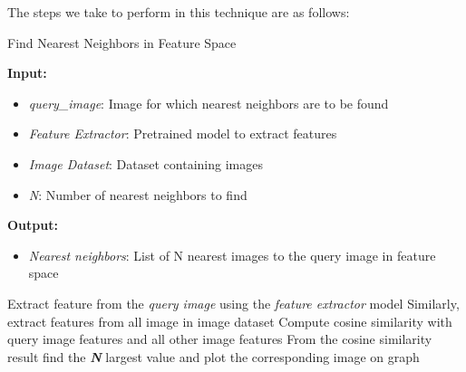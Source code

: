 The steps we take to perform in this technique are as follows:\par\vspace{1em}
\begin{algorithm}
\caption{Find Nearest Neighbors in Feature Space}
\label{alg:nearest_neighbors}

\textbf{Input:}
\begin{itemize}
    \item \textit{query\_image}: Image for which nearest neighbors are to be found
    \item \textit{Feature Extractor}: Pretrained model to extract features
    \item \textit{Image Dataset}: Dataset containing images
    \item \textit{N}: Number of nearest neighbors to find
\end{itemize}

\textbf{Output:}
\begin{itemize}
    \item \textit{Nearest neighbors}: List of N nearest images to the query image in feature space
\end{itemize}

\begin{algorithmic}[1]
    \State Extract feature from the \textit{query image} using the \textit{feature extractor} model
    \State Similarly, extract features from all image in image dataset
    \State Compute cosine similarity with query image features and all other image features
    \State From the cosine similarity result find the \textbf{\textit{N}} largest value and plot the corresponding image on graph
\end{algorithmic}
\end{algorithm}


